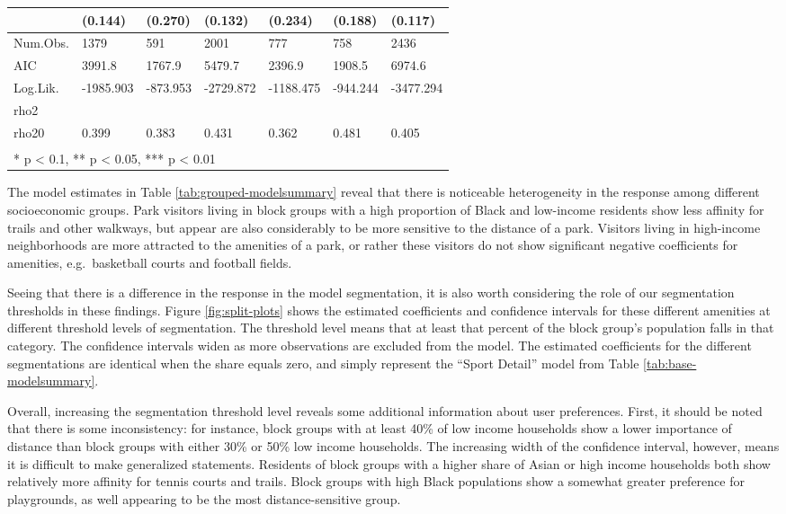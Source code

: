 \documentclass[]{elsarticle} %
\begin{document}
\begin{table}
\begin{tabular}[t]{lllllll}
 & (0.144) & (0.270) & (0.132) & (0.234) & (0.188) & (0.117)\\
\midrule
Num.Obs. & 1379 & 591 & 2001 & 777 & 758 & 2436\\
AIC & 3991.8 & 1767.9 & 5479.7 & 2396.9 & 1908.5 & 6974.6\\
Log.Lik. & -1985.903 & -873.953 & -2729.872 & -1188.475 & -944.244 & -3477.294\\
rho2 &  &  &  &  &  & \\
rho20 & 0.399 & 0.383 & 0.431 & 0.362 & 0.481 & 0.405\\
\bottomrule
\multicolumn{7}{l}{\textsuperscript{} * p < 0.1, ** p < 0.05, *** p < 0.01}\\
\end{tabular}
\end{table}

The model estimates in Table \ref{tab:grouped-modelsummary} reveal that there
is noticeable heterogeneity in the response among different socioeconomic
groups. Park visitors living in block groups with a high proportion of Black and
low-income residents show less affinity for trails and other walkways, but
appear are also considerably to be more sensitive to the distance of a park.
Visitors living in high-income neighborhoods are more attracted to the amenities
of a park, or rather these visitors do not show significant negative
coefficients for amenities, e.g.~basketball courts and football fields.

Seeing that there is a difference in the response in the model segmentation,
it is also worth considering the role of our segmentation thresholds in these
findings. Figure \ref{fig:split-plots} shows the estimated coefficients and
confidence intervals for these different amenities at different threshold levels
of segmentation. The threshold level means that at least that percent
of the block group's population falls in that category. The confidence intervals
widen as more observations are excluded from the model. The estimated coefficients
for the different segmentations are identical when the share equals zero, and
simply represent the ``Sport Detail'' model from Table \ref{tab:base-modelsummary}.

Overall, increasing the segmentation threshold level reveals some additional
information about user preferences. First, it should be noted that there is
some inconsistency: for instance, block groups with at least 40\% of low income
households show a lower importance of distance than block groups with either
30\% or 50\% low income households. The increasing width of the confidence interval,
however, means it is difficult to make generalized statements. Residents of
block groups with a higher share of Asian or high income households both show
relatively more affinity for tennis courts and trails. Block groups with high
Black populations show a somewhat greater preference for playgrounds, as well
appearing to be the most distance-sensitive group.
\end{document}
